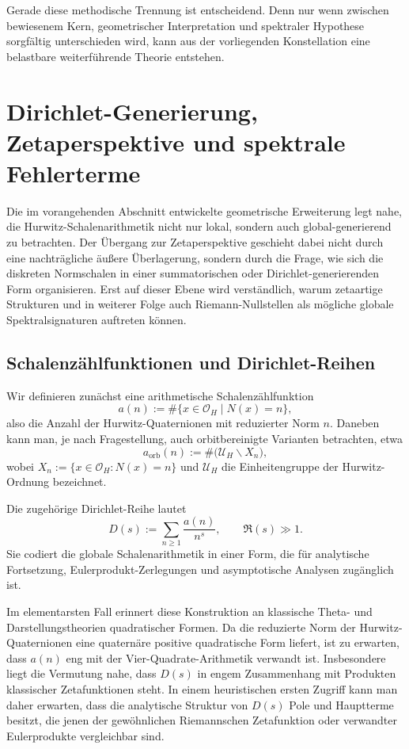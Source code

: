 \documentclass[a4paper,12pt]{article}
\theoremstyle{definition}
\numberwithin{equation}{section}
\begin{document}
	Gerade diese methodische Trennung ist entscheidend. Denn nur wenn zwischen bewiesenem Kern, geometrischer Interpretation und spektraler Hypothese sorgfältig unterschieden wird, kann aus der vorliegenden Konstellation eine belastbare weiterführende Theorie entstehen.
	
	\section{Dirichlet-Generierung, Zetaperspektive und spektrale Fehlerterme}
	
	Die im vorangehenden Abschnitt entwickelte geometrische Erweiterung legt nahe, die Hurwitz-Schalenarithmetik nicht nur lokal, sondern auch global-generierend zu betrachten. Der Übergang zur Zetaperspektive geschieht dabei nicht durch eine nachträgliche äußere Überlagerung, sondern durch die Frage, wie sich die diskreten Normschalen in einer summatorischen oder Dirichlet-generierenden Form organisieren. Erst auf dieser Ebene wird verständlich, warum zetaartige Strukturen und in weiterer Folge auch Riemann-Nullstellen als mögliche globale Spektralsignaturen auftreten können.
	
	\subsection{Schalenzählfunktionen und Dirichlet-Reihen}
	
	Wir definieren zunächst eine arithmetische Schalenzählfunktion
	\[
	a(n) := \#\{x \in \mathcal O_H \mid N(x)=n\},
	\]
	also die Anzahl der Hurwitz-Quaternionen mit reduzierter Norm $n$. Daneben kann man, je nach Fragestellung, auch orbitbereinigte Varianten betrachten, etwa
	\[
	a_{\mathrm{orb}}(n) := \#\bigl(\mathcal U_H \backslash X_n \bigr),
	\]
	wobei $X_n := \{x\in\mathcal O_H : N(x)=n\}$ und $\mathcal U_H$ die Einheitengruppe der Hurwitz-Ordnung bezeichnet.
	
	Die zugehörige Dirichlet-Reihe lautet
	\[
	D(s) := \sum_{n\geq 1} \frac{a(n)}{n^s},
	\qquad \Re(s) \gg 1.
	\]
	Sie codiert die globale Schalenarithmetik in einer Form, die für analytische Fortsetzung, Eulerprodukt-Zerlegungen und asymptotische Analysen zugänglich ist.
	
	Im elementarsten Fall erinnert diese Konstruktion an klassische Theta- und Darstellungstheorien quadratischer Formen. Da die reduzierte Norm der Hurwitz-Quaternionen eine quaternäre positive quadratische Form liefert, ist zu erwarten, dass $a(n)$ eng mit der Vier-Quadrate-Arithmetik verwandt ist. Insbesondere liegt die Vermutung nahe, dass $D(s)$ in engem Zusammenhang mit Produkten klassischer Zetafunktionen steht. In einem heuristischen ersten Zugriff kann man daher erwarten, dass die analytische Struktur von $D(s)$ Pole und Hauptterme besitzt, die jenen der gewöhnlichen Riemannschen Zetafunktion oder verwandter Eulerprodukte vergleichbar sind.
	
\end{document}
